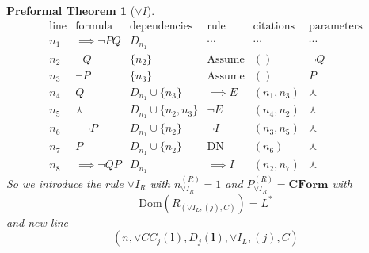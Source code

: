 \documentclass[oneside, 12pt]{book}
\theoremstyle{break}
\newtheorem{preformal definition}[definition]{Preformal Definition}
\newtheorem{preformal theorem}[theorem]{Preformal Theorem}
\newcommand{\bv}[1]{\boldsymbol{#1}}
\begin{document}
\begin{preformal theorem}[$\lor I$]
			\begin{equation*}
				\begin{array}{c|c|c|c|c|c}
					\text{line} & \text{formula} & \text{dependencies} & \text{rule} & \text{citations} & \text{parameters}\\ \hline
					n_1 & \implies \lnot P Q & D_{n_1} & \cdots & \cdots & \cdots\\
					n_2 & \lnot Q & \{n_2\} & \text{Assume} & () & \lnot Q\\
					n_3 & \lnot P & \{n_3\} & \text{Assume} & () & P\\
					n_4 & Q & D_{n_1} \cup \{n_3\} & \implies E & (n_1, n_3) & \curlywedge\\
					n_5 & \curlywedge & D_{n_1} \cup \{n_2, n_3\} & \lnot E & (n_4, n_2) & \curlywedge\\
					n_6 & \lnot \lnot P & D_{n_1} \cup \{n_2\} & \lnot I & (n_3, n_5) & \curlywedge\\
					n_7 & P & D_{n_1} \cup \{n_2\} & \text{DN} & (n_6) & \curlywedge\\
					n_8 & \implies \lnot Q P & D_{n_1} & \implies I & (n_2, n_7) & \curlywedge
				\end{array}
			\end{equation*}			
			So we introduce the rule $\lor I_R$ with $n_{\lor I_R}^{(R)} = 1$ and $P_{\lor I_R}^{(R)} = \textbf{CForm}$ with
			\begin{equation*}
				\text{Dom}(R_{(\lor I_L, (j), C)}) = L^*
			\end{equation*}
			and new line
			\begin{equation*}
				(n, \lor C C_j(\bv{l}), D_j(\bv{l}), \lor I_L, (j), C)
			\end{equation*}
		\end{preformal theorem}
	
\end{document}
